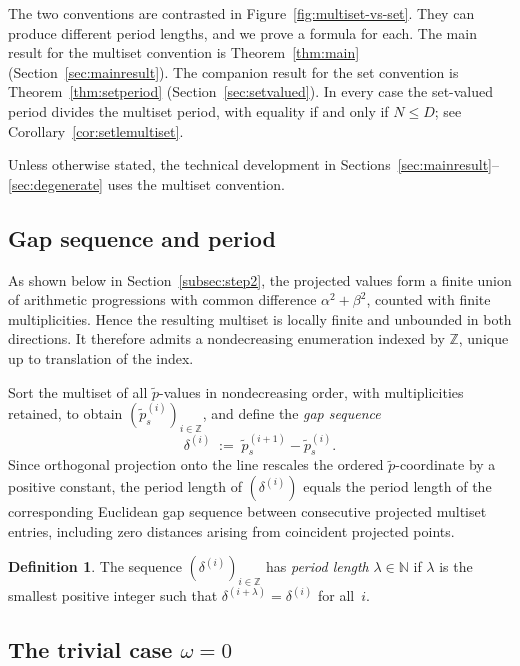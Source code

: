 \documentclass[11pt,reqno]{amsart}
\theoremstyle{plain}
\theoremstyle{definition}
\newtheorem{definition}[theorem]{Definition}
\theoremstyle{remark}
\begin{document}
The two conventions are contrasted in Figure~\ref{fig:multiset-vs-set}.
They can produce different period lengths, and we prove a
formula for each.  The main result for the multiset convention is
Theorem~\ref{thm:main} (Section~\ref{sec:mainresult}).  The companion
result for the set convention is Theorem~\ref{thm:setperiod}
(Section~\ref{sec:setvalued}).  In every case the set-valued period
divides the multiset period, with equality if and only if \(N \le D\); see
Corollary~\ref{cor:setlemultiset}.

Unless otherwise stated, the technical development in
Sections~\ref{sec:mainresult}--\ref{sec:degenerate} uses the multiset
convention.

\subsection{Gap sequence and period}\label{subsec:gapseq}

As shown below in Section~\ref{subsec:step2}, the projected values form a
finite union of arithmetic progressions with common difference
\(\alpha^2+\beta^2\), counted with finite multiplicities.  Hence the
resulting multiset is locally finite and unbounded in both directions.  It
therefore admits a nondecreasing enumeration indexed by \(\mathbb{Z}\),
unique up to translation of the index.

Sort the multiset of all \(\tilde{p}\)-values in nondecreasing order, with
multiplicities retained, to obtain
\((\tilde{p}^{(i)}_s)_{i \in \mathbb{Z}}\), and define the
\emph{gap sequence}
\begin{equation}\label{eq:delta}
    \delta^{(i)} \;:=\; \tilde{p}^{(i+1)}_s - \tilde{p}^{(i)}_s.
\end{equation}
Since orthogonal projection onto the line rescales the ordered
\(\tilde{p}\)-coordinate by a positive constant, the period length of
\((\delta^{(i)})\) equals the period length of the corresponding Euclidean
gap sequence between consecutive projected multiset entries, including
zero distances arising from coincident projected points.

\begin{definition}\label{def:period}
The sequence \((\delta^{(i)})_{i \in \mathbb{Z}}\) has \emph{period length}
\(\lambda \in \mathbb{N}\) if \(\lambda\) is the smallest positive integer
such that \(\delta^{(i+\lambda)} = \delta^{(i)}\) for all~\(i\).
\end{definition}

\subsection{\texorpdfstring{The trivial case \(\omega = 0\)}{The trivial case omega = 0}}\label{subsec:omega0}
\end{document}
